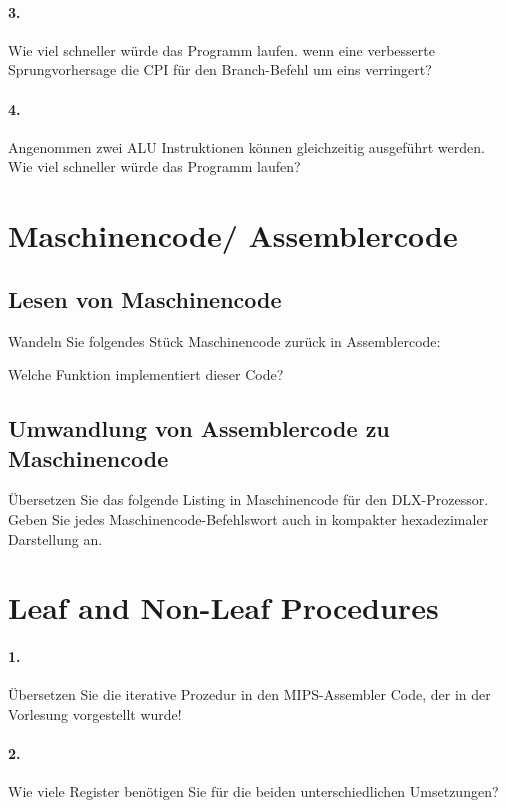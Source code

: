 \documentclass[paper=a4, fontsize=11pt]{scrartcl}
\numberwithin{equation}{section}
\numberwithin{figure}{section}
\numberwithin{table}{section}
\begin{document}
\paragraph{3.}
Wie viel schneller würde das Programm laufen. wenn eine verbesserte Sprungvorhersage die CPI für den Branch-Befehl um eins verringert?

\paragraph{4.}
Angenommen zwei ALU Instruktionen können gleichzeitig ausgeführt werden. Wie viel schneller würde das Programm laufen?

\section{Maschinencode/ Assemblercode}
\subsection{Lesen von Maschinencode}
Wandeln Sie folgendes Stück Maschinencode zurück in Assemblercode:

Welche Funktion implementiert dieser Code?

\subsection{Umwandlung von Assemblercode zu Maschinencode}
Übersetzen Sie das folgende Listing in Maschinencode für den DLX-Prozessor. Geben Sie jedes Maschinencode-Befehlswort auch in kompakter hexadezimaler Darstellung an.

\section{Leaf and Non-Leaf Procedures}

\paragraph{1.}
Übersetzen Sie die iterative Prozedur in den MIPS-Assembler Code, der in der Vorlesung vorgestellt wurde!

\paragraph{2.}
Wie viele Register benötigen Sie für die beiden unterschiedlichen Umsetzungen?
\end{document}
